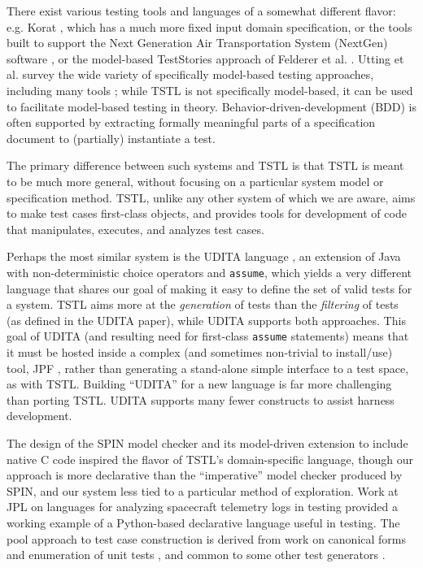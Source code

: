 There exist various testing tools and languages of a somewhat
different flavor: e.g. Korat \cite{Korat}, which has a much more fixed
input domain specification, or the tools built to support the Next
Generation Air Transportation System (NextGen) software
\cite{TameInputs}, or the model-based TestStories approach of Felderer et
al. \cite{TestStories}.  Utting et al. survey the wide variety of
specifically model-based testing approaches, including many tools
\cite{Taxonomy}; while TSTL is not specifically model-based, it can be
used to facilitate model-based testing in theory.
Behavior-driven-development (BDD) \cite{BDD} is often supported by extracting
formally meaningful parts of a specification document to (partially)
instantiate a test.

The primary difference between such systems and TSTL is that TSTL is
meant to be much more general, without focusing on a particular system
model or specification method.  
TSTL, unlike any other system of which we are
aware, aims to make test cases first-class objects, and provides tools
for development of code that manipulates, executes, and analyzes test
cases.  


Perhaps the most similar system is the UDITA language
\cite{UDITA}, an extension of Java with non-deterministic choice
operators and {\tt assume}, which yields a very different language
that shares our goal of making it easy to define the set of valid
tests for a system.  TSTL aims more at the \emph{generation} of
tests than the \emph{filtering} of tests (as defined in the UDITA
paper), while UDITA supports both approaches.  This goal of UDITA (and
resulting need for first-class {\tt assume} statements) means that it
must be hosted inside a complex (and sometimes non-trivial to
install/use) tool, JPF \cite{JPF2}, rather than generating a
stand-alone simple interface to a test space, as with TSTL.  Building
``UDITA'' for a new language is far more challenging than porting
TSTL.  UDITA supports many fewer constructs to assist harness
development.


The design of the SPIN model checker \cite{SPIN} and its model-driven
extension to include native C code \cite{ModelDriven} inspired the
flavor of TSTL's domain-specific language, though our approach is more
declarative than the ``imperative'' model checker produced by SPIN,
and our system less tied to a particular method of exploration.
Work at JPL on languages for analyzing spacecraft telemetry
logs in testing \cite{scriptstospecs} provided a working example of a
Python-based declarative language useful in testing.  The pool
approach to test case construction is derived from work on canonical
forms and enumeration of unit tests \cite{AndrewsTR}, and common to
some other test generators \cite{Pacheco}.

